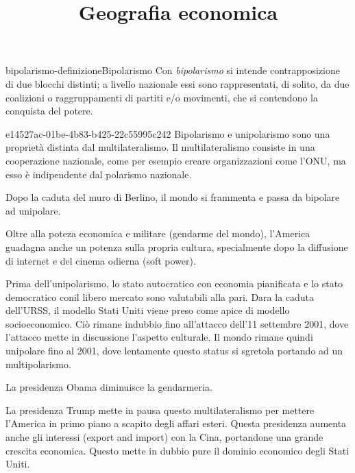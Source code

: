 \documentclass[preview]{standalone}
\begin{document}
\title{Geografia economica}
\genpage

\begin{snippetdefinition}{bipolarismo-definizione}{Bipolarismo}
    Con \textit{bipolarismo} si intende contrapposizione di due blocchi distinti;
    a livello nazionale essi sono rappresentati, di solito, da due coalizioni o
    raggruppamenti di partiti e/o movimenti, che si contendono la conquista del potere.
\end{snippetdefinition}

\begin{snippet}{e14527ac-01be-4b83-b425-22c55995c242}
    Bipolarismo e unipolarismo sono una proprietà distinta dal multilateralismo.
    Il multilateralismo consiste in una cooperazione nazionale, come per esempio creare organizzazioni
    come l'ONU, ma esso è indipendente dal polarismo nazionale.

    Dopo la caduta del muro di Berlino, il mondo si frammenta e passa da bipolare ad unipolare.

    Oltre alla poteza economica e militare (gendarme del mondo), l'America
    guadagna anche un potenza sulla propria cultura, specialmente dopo la diffusione di internet
    e del cinema odierna (soft power).

    Prima dell'unipolarismo, lo stato autocratico con economia pianificata e
    lo stato democratico conil libero mercato sono valutabili alla pari.
    Dara la caduta dell'URSS, il modello Stati Uniti viene preso come apice
    di modello socioeconomico.
    Ciò rimane indubbio fino all'attacco dell'11 settembre 2001, dove l'attacco mette
    in discussione l'aspetto culturale.
    Il mondo rimane quindi unipolare fino al 2001, dove lentamente questo status si sgretola
    portando ad un multipolarismo.

    La presidenza Obama diminuisce la gendarmeria.

    La presidenza Trump mette in pausa questo multilateralismo per mettere l'America
    in primo piano a scapito degli affari esteri.
    Questa presidenza aumenta anche gli interessi (export and import) con la Cina, portandone
    una grande crescita economica. Questo mette in dubbio pure
    il dominio economico degli Stati Uniti.
\end{snippet}
\end{document}

